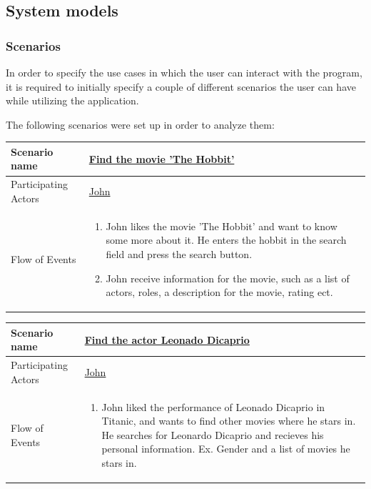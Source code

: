 \subsection{System models}

\subsubsection{Scenarios}
In order to specify the use cases in which the user can interact with the program, it is required to initially specify a couple of different scenarios the user can have while utilizing the application.

The following scenarios were set up in order to analyze them:

\begin{center}
	\begin{tabular}{ | l | p{10cm} |  }
		 \hline
		Scenario name & \underline{Find the movie 'The Hobbit'}  \\ \hline
		Participating Actors & \underline{John} \\ \hline
		Flow of Events & \begin{enumerate}
						\item John likes the movie 'The Hobbit' and want to know some more about it. He enters the hobbit in the search field and press the search button.
						\item John receive information for the movie, such as a list of actors, roles, a description for the movie, rating ect.
						\end{enumerate}
						\\ \hline
						
	\end{tabular}
\end{center}


\begin{center}
	\begin{tabular}{ | l | p{10cm} |  }
		 \hline
		Scenario name & \underline{Find the actor Leonado Dicaprio}  \\ \hline
		Participating Actors & \underline{John} \\ \hline
		Flow of Events & \begin{enumerate}
						\item John liked the performance of Leonado Dicaprio in Titanic, and wants to find other movies where he stars in. He searches for Leonardo Dicaprio and recieves his personal information. Ex. Gender and a list of movies he stars in.
						\end{enumerate}
						\\ \hline
						
	\end{tabular}
\end{center}


